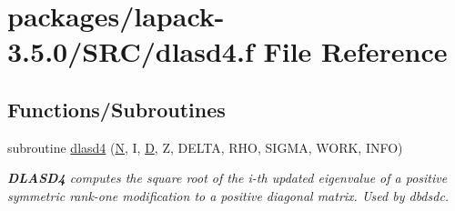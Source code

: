 \hypertarget{dlasd4_8f}{}\section{packages/lapack-\/3.5.0/\+S\+R\+C/dlasd4.f File Reference}
\label{dlasd4_8f}
\subsection*{Functions/\+Subroutines}
\begin{DoxyCompactItemize}
\item 
subroutine \hyperlink{group__auxOTHERauxiliary_gaf0ba74a3731059f524f3bdb703fd6fb4}{dlasd4} (\hyperlink{polmisc_8c_a0240ac851181b84ac374872dc5434ee4}{N}, I, \hyperlink{odrpack_8h_a7dae6ea403d00f3687f24a874e67d139}{D}, Z, D\+E\+L\+T\+A, R\+H\+O, S\+I\+G\+M\+A, W\+O\+R\+K, I\+N\+F\+O)
\begin{DoxyCompactList}\small\item\em {\bfseries D\+L\+A\+S\+D4} computes the square root of the i-\/th updated eigenvalue of a positive symmetric rank-\/one modification to a positive diagonal matrix. Used by dbdsdc. \end{DoxyCompactList}\end{DoxyCompactItemize}

